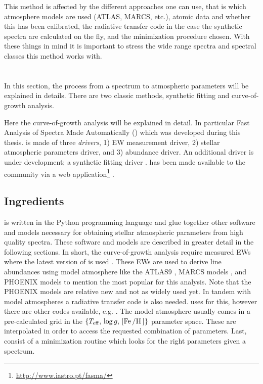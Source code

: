 This method is affected by the different approaches one can use, that is which
atmosphere models are used (ATLAS, MARCS, etc.), atomic data and whether this
has been calibrated, the radiative transfer code in the case the synthetic
spectra are calculated on the fly, and the minimization procedure chosen. With
these things in mind it is important to stress the wide range spectra and
spectral classes this method works with.




\section{\FASMA}
\label{sec:parameters}

In this section, the process from a spectrum to atmospheric parameters will be
explained in details. There are two classic methods, synthetic fitting and
curve-of-growth analysis.

Here the curve-of-growth analysis will be explained in detail. In particular
Fast Analysis of Spectra Made Automatically (\FASMA) which was developed during
this thesis. \FASMA is made of three \emph{drivers}, 1) EW measurement driver,
2) stellar atmospheric parameters driver, and 3) abundance driver. An additional
driver is under development; a synthetic fitting driver \citep{Tsantaki2017}.
\FASMA has been made available to the community via a web
application\footnote{\url{http://www.iastro.pt/fasma/}} \citep{Andreasen2017a}.


\subsection{Ingredients}

\FASMA is written in the Python programming language and glue together other
software and models necessary for obtaining stellar atmospheric parameters from
high quality spectra. These software and models are described in greater detail
in the following sections. In short, the curve-of-growth analysis require
measured EWs where the latest version of \ARES is used \citep{Sousa2015a}. These
EWs are used to derive line abundances using model atmosphere like the ATLAS9
\citep{Kurucz1993}, MARCS models \citep{Gustafson2008}, and PHOENIX models
\citep{Husser2013} to mention the most popular for this analysis. Note that the
PHOENIX models are relative new and not as widely used yet. In tandem with model
atmospheres a radiative transfer code is also needed. \FASMA uses \MOOG
\citep{Sneden1973} for this, however there are other codes available, e.g.
. The model atmosphere usually comes
in a pre-calculated grid in the $\{T_\mathrm{eff},\,\log
g,\,[\ion{Fe}/\ion{H}]\}$ parameter space. These are interpolated in order to
access the requested combination of parameters. Last, \FASMA consist of a
minimization routine which looks for the right parameters given a spectrum.



